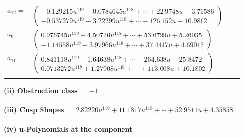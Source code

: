 \documentclass[1p]{elsarticle_modified}
\theoremstyle{definition}
\begin{document}
\begin{tabular}{m{7pt} m{180pt} m{7pt} m{180pt} }
\flushright $a_{12}=$&$\begin{pmatrix}-0.129215 u^{119}-0.0784645 u^{118}+\cdots+22.9748 u-3.73586\\-0.537279 u^{119}-3.22299 u^{118}+\cdots-126.152 u-10.9862\end{pmatrix}$ \\
\flushright $a_{6}=$&$\begin{pmatrix}0.976745 u^{119}+4.50726 u^{118}+\cdots+53.6799 u+5.26035\\-1.14558 u^{119}-3.97966 u^{118}+\cdots+37.4447 u+4.69013\end{pmatrix}$ \\
\flushright $a_{11}=$&$\begin{pmatrix}0.841118 u^{119}+1.64638 u^{118}+\cdots-264.638 u-25.8472\\0.0713272 u^{119}+1.27908 u^{118}+\cdots+113.008 u+10.1802\end{pmatrix}$\\&\end{tabular}
\flushleft \textbf{(ii) Obstruction class $= -1$}\\~\\
\flushleft \textbf{(iii) Cusp Shapes $= 2.82220 u^{119}+11.1817 u^{118}+\cdots+52.9511 u+4.35858$}\\~\\
\newpage\renewcommand{\arraystretch}{1}
\flushleft \textbf{(iv) u-Polynomials at the component}\newline \\
\end{document}
